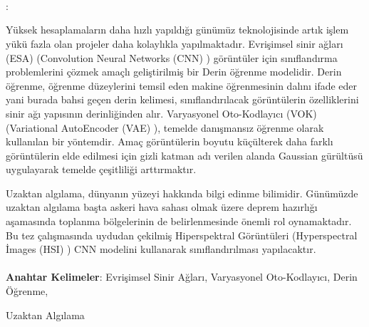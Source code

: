 \chapter*{\normalfont \ozetName}


\begin{center}
\vspace{-1.2cm}
    \ozetContentName \\
    \vspace{0.33cm}
    \titleTR \\
    \vspace{0.33cm}
    \studentNameFill \\
    \vspace{0.33cm}
    \ktu \\
    \titleFacLow \\
    \anabilimLow \\
    \advisorT : \advisorTFill
\end{center}
\vspace{0.5cm}
\hspace{0.8cm} Yüksek hesaplamaların daha hızlı yapıldığı günümüz teknolojisinde artık işlem yükü fazla olan projeler daha kolaylıkla yapılmaktadır. Evrişimsel sinir ağları (ESA) (Convolution Neural Networks (CNN) ) görüntüler için sınıflandırma problemlerini çözmek amaçlı geliştirilmiş bir Derin öğrenme modelidir.
Derin öğrenme, öğrenme düzeylerini temsil eden makine öğrenmesinin dalını ifade eder yani burada bahsi geçen derin kelimesi, sınıflandırılacak görüntülerin özelliklerini sinir ağı yapısının derinliğinden alır. Varyasyonel Oto-Kodlayıcı (VOK) (Variational AutoEncoder (VAE) ), temelde danışmansız öğrenme olarak kullanılan bir yöntemdir. Amaç görüntülerin boyutu küçülterek daha farklı görüntülerin elde edilmesi için gizli katman adı verilen alanda Gaussian gürültüsü uygulayarak temelde çeşitliliği arttırmaktır. 

Uzaktan algılama, dünyanın yüzeyi hakkında bilgi edinme bilimidir. Günümüzde uzaktan algılama başta askeri hava sahası olmak üzere deprem hazırlığı aşamasında toplanma bölgelerinin de belirlenmesinde önemli rol oynamaktadır. Bu tez çalışmasında uydudan çekilmiş Hiperspektral Görüntüleri (Hyperspectral İmages (HSI) ) CNN modelini kullanarak sınıflandırılması yapılacaktır.
\\
\\
\textbf{Anahtar Kelimeler}: Evrişimsel Sinir Ağları, Varyasyonel Oto-Kodlayıcı, Derin Öğrenme, 

                            \hspace{2.7cm}Uzaktan Algılama

